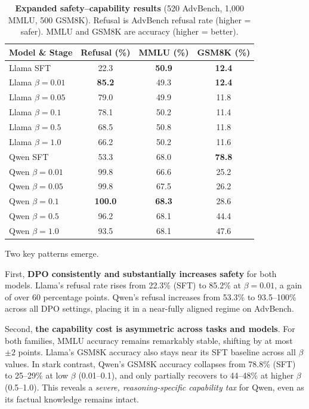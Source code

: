 \documentclass[a4paper, twocolumn, 9pt]{article}
\begin{document}
\begin{table}[t]
\centering
\caption{\textbf{Expanded safety--capability results} (520 AdvBench, 1{,}000 MMLU, 500 GSM8K).
Refusal is AdvBench refusal rate (higher = safer). MMLU and GSM8K are accuracy (higher = better).}
\label{tab:main_results}
\begin{tabular}{lccc}
\toprule
Model \& Stage          & Refusal (\%) & MMLU (\%) & GSM8K (\%) \\
\midrule
Llama SFT         & 22.3 & \textbf{50.9} & \textbf{12.4} \\
Llama $\beta=0.01$& \textbf{85.2} & 49.3 & \textbf{12.4} \\
Llama $\beta=0.05$& 79.0 & 49.9 & 11.8 \\
Llama $\beta=0.1$ & 78.1 & 50.2 & 11.4 \\
Llama $\beta=0.5$ & 68.5 & 50.8 & 11.8 \\
Llama $\beta=1.0$ & 66.2 & 50.2 & 11.6 \\
\midrule
Qwen SFT         & 53.3 & 68.0 & \textbf{78.8} \\
Qwen $\beta=0.01$& 99.8 & 66.6 & 25.2 \\
Qwen $\beta=0.05$& 99.8 & 67.5 & 26.2 \\
Qwen $\beta=0.1$ & \textbf{100.0} & \textbf{68.3} & 28.6 \\
Qwen $\beta=0.5$ & 96.2 & 68.1 & 44.4 \\
Qwen $\beta=1.0$ & 93.5 & 68.1 & 47.6 \\
\bottomrule
\end{tabular}
\end{table}

Two key patterns emerge.

First, \textbf{DPO consistently and substantially increases safety} for both models.
Llama's refusal rate rises from 22.3\% (SFT) to 85.2\% at $\beta=0.01$,
a gain of over 60 percentage points.
Qwen's refusal increases from 53.3\% to 93.5--100\% across all DPO settings,
placing it in a near-fully aligned regime on AdvBench.

Second, \textbf{the capability cost is asymmetric across tasks and models}.
For both families, MMLU accuracy remains remarkably stable, shifting by at most
$\pm 2$ points.
Llama's GSM8K accuracy also stays near its SFT baseline across all $\beta$ values.
In stark contrast, Qwen's GSM8K accuracy collapses from 78.8\% (SFT)
to 25--29\% at low $\beta$ (0.01--0.1), and only partially recovers to 44--48\%
at higher $\beta$ (0.5--1.0).
This reveals a \emph{severe, reasoning-specific capability tax} for Qwen,
even as its factual knowledge remains intact.
\end{document}
